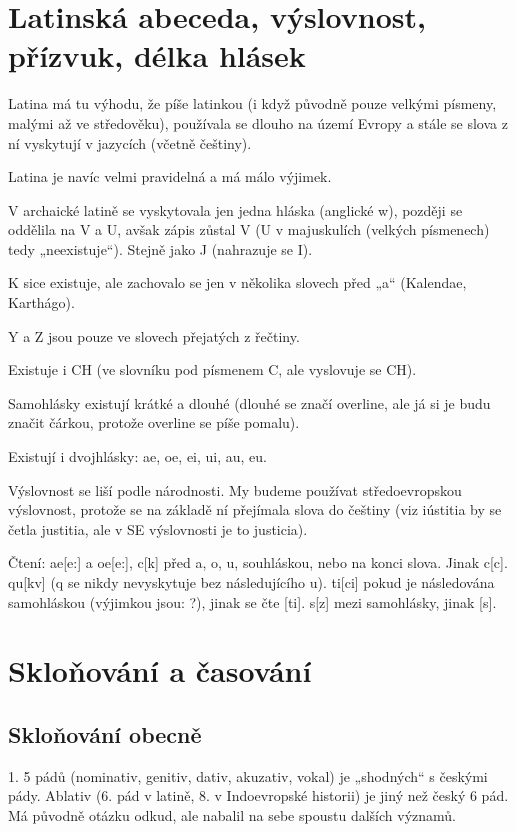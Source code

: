 \documentclass[12pt]{article}					%
\begin{document}
\section{Latinská abeceda, výslovnost, přízvuk, délka hlásek}
Latina má tu výhodu, že píše latinkou (i když původně pouze velkými písmeny, malými až ve středověku), používala se dlouho na území Evropy a stále se slova z ní vyskytují v jazycích (včetně češtiny).

    Latina je navíc velmi pravidelná a má málo výjimek. 

    V archaické latině se vyskytovala jen jedna hláska (anglické w), později se oddělila na V a U, avšak zápis zůstal V (U v majuskulích (velkých písmenech) tedy „neexistuje“). Stejně jako J (nahrazuje se I).

    K sice existuje, ale zachovalo se jen v několika slovech před „a“ (Kalendae, Karthágo).

    Y a Z jsou pouze ve slovech přejatých z řečtiny.

    Existuje i CH (ve slovníku pod písmenem C, ale vyslovuje se CH).

    Samohlásky existují krátké a dlouhé (dlouhé se značí overline, ale já si je budu značit čárkou, protože overline se píše pomalu).

    Existují i dvojhlásky: ae, oe, ei, ui, au, eu.

    Výslovnost se liší podle národnosti. My budeme používat středoevropskou výslovnost, protože se na základě ní přejímala slova do češtiny (viz iústitia by se četla justitia, ale v SE výslovnosti je to justicia).

    Čtení: ae[e:] a oe[e:], c[k] před a, o, u, souhláskou, nebo na konci slova. Jinak c[c]. qu[kv] (q se nikdy nevyskytuje bez následujícího u). ti[ci] pokud je následována samohláskou (výjimkou jsou: ?), jinak se čte [ti]. s[z] mezi samohlásky, jinak [s].


\section{Skloňování a časování}
    \subsection{Skloňování obecně}
        1. 5 pádů (nominativ, genitiv, dativ, akuzativ, vokal) je „shodných“ s českými pády. Ablativ (6. pád v latině, 8. v Indoevropské historii) je jiný než český 6 pád. Má původně otázku odkud, ale nabalil na sebe spoustu dalších významů.
\end{document}

